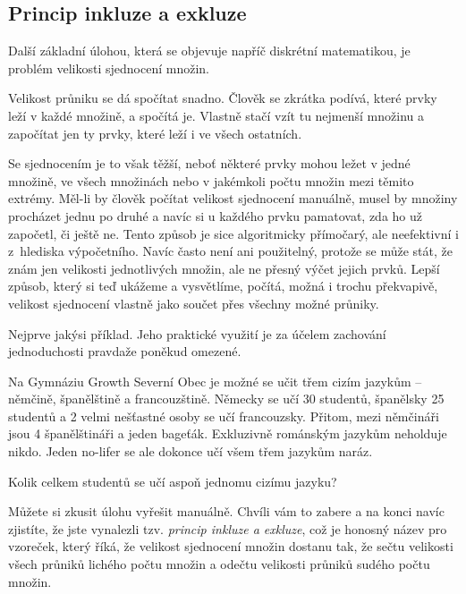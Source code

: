 \subsection{Princip inkluze a exkluze}
\label{ssec:princip-inkluze-a-exkluze}

Další základní úlohou, která se objevuje napříč diskrétní matematikou, je
problém velikosti sjednocení množin.

Velikost průniku se dá spočítat snadno. Člověk se zkrátka podívá, které prvky
leží v každé množině, a spočítá je. Vlastně stačí vzít tu nejmenší množinu a
započítat jen ty prvky, které leží i ve všech ostatních.

Se sjednocením je to však těžší, neboť některé prvky mohou ležet v jedné
množině, ve všech množinách nebo v jakémkoli počtu množin mezi těmito extrémy.
Měl-li by člověk počítat velikost sjednocení manuálně, musel by množiny
procházet jednu po druhé a navíc si u každého prvku pamatovat, zda ho už
započetl, či ještě ne. Tento způsob je sice algoritmicky přímočarý, ale
neefektivní i z~hlediska výpočetního. Navíc často není ani použitelný, protože
se může stát, že znám jen velikosti jednotlivých množin, ale ne přesný výčet 
jejich prvků. Lepší způsob, který si teď ukážeme a vysvětlíme, počítá, možná i
trochu překvapivě, velikost sjednocení vlastně jako součet přes všechny možné
průniky.

Nejprve jakýsi  příklad. Jeho praktické využití je za účelem
zachování jednoduchosti pravdaže poněkud omezené.

\begin{example}
 \label{exam:inkluze-exkluze}
 Na Gymnáziu Growth Severní Obec je možné se učit třem cizím jazykům -- němčině,
 španělštině a francouzštině. Německy se učí 30 studentů, španělsky 25 studentů
 a 2 velmi nešťastné osoby se učí francouzsky. Přitom, mezi němčináři jsou 4
 španělštináři a jeden bageťák. Exkluzivně románským jazykům neholduje nikdo.
 Jeden no-lifer se ale dokonce učí všem třem jazykům naráz.

 Kolik celkem studentů se učí aspoň jednomu cizímu jazyku?
\end{example}

Můžete si zkusit úlohu vyřešit manuálně. Chvíli vám to zabere a na konci navíc
zjistíte, že jste vynalezli tzv. \emph{princip inkluze a exkluze}, což je
honosný název pro vzoreček, který říká, že velikost sjednocení množin dostanu
tak, že sečtu velikosti všech průniků lichého počtu množin a odečtu velikosti
průniků sudého počtu množin.

